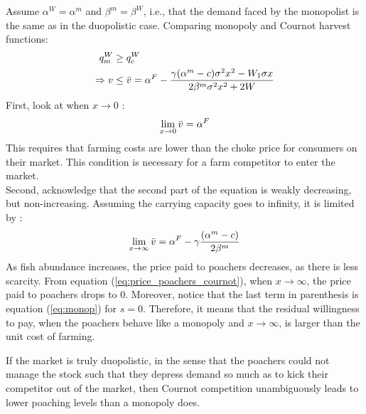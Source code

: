 Assume $\alpha^W = \alpha^m$ and $\beta^m  =\beta^W$, i.e., that the demand faced by the monopolist is the same as in the duopolistic case.  Comparing monopoly and Cournot harvest functions:
\begin{align*}
q^W_m &\geq q^W_c\\
    \Rightarrow v & \leq \Bar{v}=\alpha^F - \frac{\gamma(\alpha^m - c)\sigma^2x^2 - W_1\sigma x}{2\beta^m\sigma^2x^2 + 2W}
\end{align*}
First, look at when $x \to 0$ : 
$$
\lim_{x\to 0}\Bar{v} = \alpha^F
$$
This requires that farming costs are lower than the choke price for consumers on their market. This condition is necessary for a farm competitor to enter the market. 
\\
Second, acknowledge that the second part of the equation is weakly decreasing, but non-increasing. Assuming the carrying capacity goes to infinity, it is limited by :
$$
\lim_{x \to \infty}\Bar{v} = \alpha^F - \gamma\frac{(\alpha^m - c)}{2\beta^m}
$$
As fish abundance increases, the price paid to poachers decreases, as there is less scarcity. From equation (\ref{eq:price_poachers_cournot}), when $x \to \infty$, the price paid to poachers drops to 0. 
Moreover, notice that the last term in parenthesis is equation (\ref{eq:monop}) for $s=0$. Therefore, it means that the residual willingness to pay, when the poachers behave like a monopoly and $x\to \infty$, is larger than the unit cost of farming. 

If the market is truly duopolistic, in the sense that the poachers could not manage the stock such that they depress demand so much as to kick their competitor out of the market, then Cournot competition unambiguously leads to lower poaching levels than a monopoly does.
%
